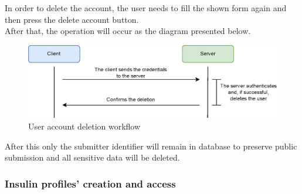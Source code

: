 In order to delete the account, the user needs to fill the shown form again and then press the delete account button.\\

After that, the operation will occur as the diagram presented below.

\begin{figure}[H]
    \begin{center}
        \includegraphics[scale=1]{_figures/user-deletion-workflow.eps}
        \caption{User account deletion workflow}
    \end{center}
\end{figure}

After this only the submitter identifier will remain in database to preserve public submission and all sensitive data
will be deleted.

\subsubsection{Insulin profiles' creation and access}


